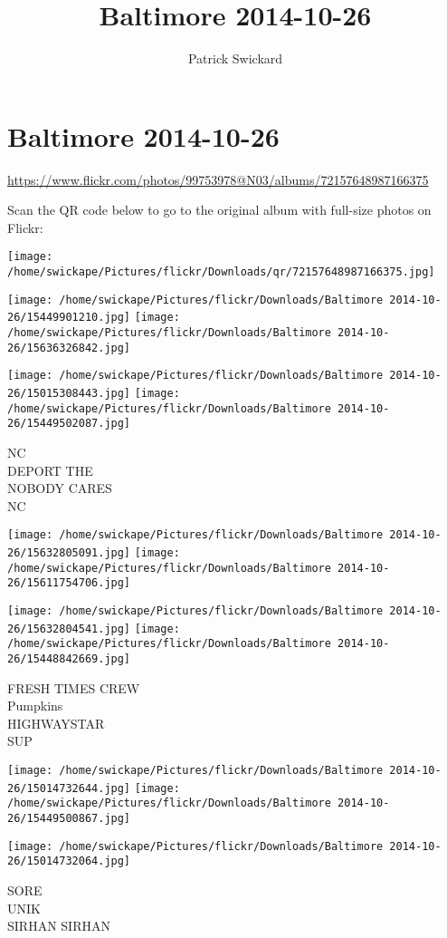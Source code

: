 \documentclass[10pt,letterpaper]{article}
\title{Baltimore 2014-10-26}
\author{Patrick Swickard}
\date{}
\begin{document}
\section*{Baltimore 2014-10-26}

\url{https://www.flickr.com/photos/99753978@N03/albums/72157648987166375}

Scan the QR code below to go to the original album with full-size photos on Flickr:

\texttt{[image: /home/swickape/Pictures/flickr/Downloads/qr/72157648987166375.jpg]}
\pagebreak

\texttt{[image: /home/swickape/Pictures/flickr/Downloads/Baltimore 2014-10-26/15449901210.jpg]}
\texttt{[image: /home/swickape/Pictures/flickr/Downloads/Baltimore 2014-10-26/15636326842.jpg]}

\texttt{[image: /home/swickape/Pictures/flickr/Downloads/Baltimore 2014-10-26/15015308443.jpg]}
\texttt{[image: /home/swickape/Pictures/flickr/Downloads/Baltimore 2014-10-26/15449502087.jpg]}

NC\\
DEPORT THE\\
NOBODY CARES\\
NC
\pagebreak

\texttt{[image: /home/swickape/Pictures/flickr/Downloads/Baltimore 2014-10-26/15632805091.jpg]}
\texttt{[image: /home/swickape/Pictures/flickr/Downloads/Baltimore 2014-10-26/15611754706.jpg]}

\texttt{[image: /home/swickape/Pictures/flickr/Downloads/Baltimore 2014-10-26/15632804541.jpg]}
\texttt{[image: /home/swickape/Pictures/flickr/Downloads/Baltimore 2014-10-26/15448842669.jpg]}

FRESH TIMES CREW\\
Pumpkins\\
HIGHWAYSTAR\\
SUP
\pagebreak

\texttt{[image: /home/swickape/Pictures/flickr/Downloads/Baltimore 2014-10-26/15014732644.jpg]}
\texttt{[image: /home/swickape/Pictures/flickr/Downloads/Baltimore 2014-10-26/15449500867.jpg]}

\texttt{[image: /home/swickape/Pictures/flickr/Downloads/Baltimore 2014-10-26/15014732064.jpg]}

SORE\\
UNIK\\
SIRHAN SIRHAN
\pagebreak
\end{document}
